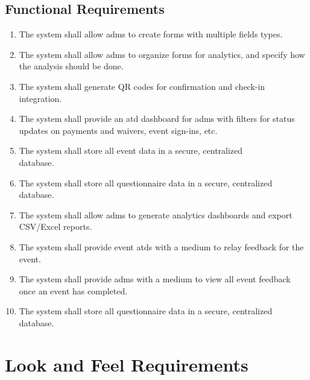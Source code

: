 \documentclass[12pt]{article}
\begin{document}
\subsection{Functional Requirements}
\begin{enumerate}[align=left,
  leftmargin=*,
  labelsep=1em,
  itemindent=0em,
  label=\bfseries FR-\arabic*:]
  \item The system shall allow \glspl{adm} to create forms with multiple fields types.
  \item The system shall allow \glspl{adm} to organize forms for analytics, and specify how
    the analysis should be done.
  \item The system shall generate QR codes for confirmation and check-in integration.
  \item The system shall provide an \gls{atd} dashboard for \glspl{adm} with filters
    for status updates on payments and waivers, event sign-ins, etc.
  \item The system shall store all event data in a secure, centralized\\database.
  \item The system shall store all questionnaire data in a secure, centralized database.
  \item The system shall allow \glspl{adm} to generate analytics dashboards and export
    CSV/Excel reports.
  \item The system shall provide event \glspl{atd} with a medium to relay feedback for the
    event.
  \item The system shall provide \glspl{adm} with a medium to view all event feedback
    once an event has completed.
  \item{The system shall store all questionnaire data in a secure, centralized database.}
\end{enumerate}

\section{Look and Feel Requirements}
\end{document}
